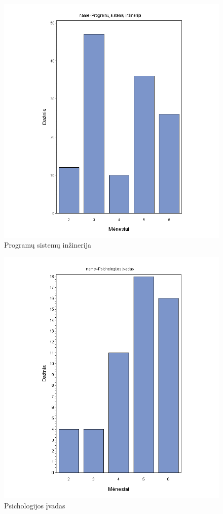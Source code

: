 \begin{figure}[htb]
\includegraphics[width=0.9\linewidth]{images/months/Programu_sistemu_inzinerija.png}
\caption{Programų sistemų inžinerija}
\label{fig:psi}
\end{figure}

\begin{figure}[htb]
\includegraphics[width=0.9\linewidth]{images/months/Psichologijos_ivadas.png}
\caption{Psichologijos įvadas}
\label{fig:psicho}
\end{figure}

